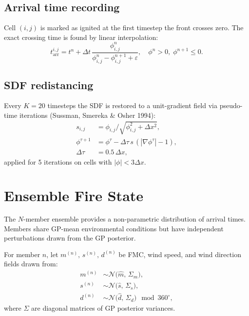 \documentclass[11pt,twocolumn]{article}
\begin{document}
\subsection{Arrival time recording}

Cell $(i,j)$ is marked as ignited at the first timestep the front
crosses zero.  The exact crossing time is found by linear
interpolation:
\begin{equation}
  t_{\mathrm{arr}}^{i,j} = t^n + \Delta t\,
  \frac{\phi^n_{i,j}}{\phi^n_{i,j}-\phi^{n+1}_{i,j}+\varepsilon},
  \quad\phi^n>0,\;\phi^{n+1}\le0.\label{eq:tarr}
\end{equation}

\subsection{SDF redistancing}

Every $K=20$ timesteps the SDF is restored to a unit-gradient
field via pseudo-time iterations (Sussman, Smereka \& Osher 1994):
\begin{align}
  s_{i,j} &= \phi_{i,j}/\sqrt{\phi_{i,j}^2+\Delta x^2},\label{eq:sign}\\
  \phi^{\tau+1} &= \phi^\tau - \Delta\tau\,s\,(|\nabla\phi^\tau|-1),\label{eq:redist}\\
  \Delta\tau &= 0.5\,\Delta x,
\end{align}
applied for 5 iterations on cells with $|\phi|<3\Delta x$.

\section{Ensemble Fire State}
\label{sec:ensemble}

The $N$-member ensemble provides a non-parametric distribution of
arrival times.  Members share GP-mean environmental conditions but
have independent perturbations drawn from the GP posterior.

For member $n$, let $m^{(n)},\,s^{(n)},\,d^{(n)}$ be FMC, wind
speed, and wind direction fields drawn from:
\begin{align}
  m^{(n)} &\sim \mathcal{N}\!\bigl(\hat{m},\,\Sigma_m\bigr),\label{eq:mpert}\\
  s^{(n)} &\sim \mathcal{N}\!\bigl(\hat{s},\,\Sigma_s\bigr),\label{eq:spert}\\
  d^{(n)} &\sim \mathcal{N}\!\bigl(\hat{d},\,\Sigma_d\bigr)\mod360^\circ,\label{eq:dpert}
\end{align}
where $\Sigma$ are diagonal matrices of GP posterior variances.
\end{document}
